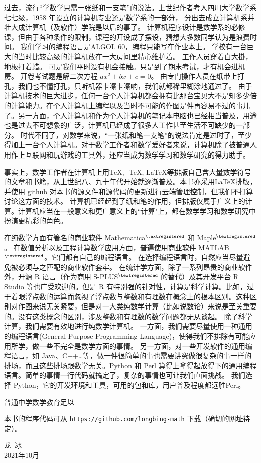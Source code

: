 \documentclass[main.tex]{subfiles}
\begin{document}
过去，流行“学数学只需一张纸和一支笔”的说法。上世纪作者考入四川大学数学系七七级，1958 年设立的计算机专业还是数学系的一部分，
分出去成立计算机系并壮大成计算机（及软件）学院是以后的事了。
计算机程序设计是数学系的必修课，但由于各种条件的限制，课程的开设成了摆设，猜想大多数同学认为是浪费时间。
我们学习的编程语言是ALGOL 60，编程只能写在作业本上。
学校有一台巨大的当时比较高级的计算机放在一大房间里精心维护着。
工作人员穿着白大掛，地板打着蜡。
可是我们平时没有机会接触。只是到了期末考试，才有机会进机房。
开卷考试题是解二次方程 $ax^2+bx+c = 0$。
由专门操作人员在纸带上打孔，我们也不懂打孔，只听机器卡嚓卡嚓响，我们就都稀里糊涂地通过了。
由于计算机技术的巨大进步，任何一台个人计算机都会拥有比那台宝贝大不是知多少倍的计算能力。在个人计算机上编程以及当时不可能的作图是件再容易不过的事儿了。另一方面，个人计算机和作为个人计算机的笔记本电脑也已经相当普及，用途也是过去不可想象的广泛，计算机已经成了很多人工作甚至生活不可缺少的一部分。
时代不同了，对数学来说，“一张纸和笔一支笔”的说法肯定是过时了，至少得加上一台个人计算机。对于数学工作者和数学爱好者来说，计算机除了被普通人用作上互联网和玩游戏的工具外，还应当成为数学学习和数学研究的得力助手。

事实上，数学工作者在计算机上用\TeX, \AmS-\TeX, \LaTeX 等排版自己含大量数学符号的文章和书籍，从上世纪八、九十年代开始就逐渐普及。本书亦采用\LaTeX 排版， 并使用 github 对本书的源文件和源代码的更新进行云端管理控制，但我们不打算讨论这方面的技术。
计算机已经起到了纸和笔的作用，但排版仅属于广义上的计算。计算机应当在一般意义和更广意义上的“计算"上，都在数学学习和数学研究中扮演更精彩的角色。

在纯数学方面有箸名的商业软件 Mathematica${}^{\textregistered}$ 和 Maple${}^{\textregistered}$。
在数值分析以及工程计算数学应用方面，普遍使用商业软件 MATLAB${}^{\textregistered}$。它们都有自己的编程语言。
在选择编程语言时，自然应当尽量避免被必须与之匹配的商业软件套牢。
在统计学方面，除了一系列昂贵的商业软件外，开源 R 语言（作为商用 S-PLUS${}^{\textregistered}$ 的替代）及其开发平台 R Studio 等也广受欢迎的。但是 R 有特别强的针对性，计算是科学计算。比如，过于着眼浮点数的运算而忽视了浮点数与整数和有理数在概念上的根本区别。这种区别对作图来说无关紧要，但是对一大类纯数学计算（比如说数论）来说是至关重要的。没有这类概念的区别，涉及整数和有理数的数学问题都无从谈起。
除了科学计算，我们需要有效地进行纯数学计算机。
一方面，我们需要尽量使用一种通用的编程语言(General-Purpose Programming Language)，使得我们不排除有可能应用所学，做一些不完全是数学方面的事情。
另一方面，对一些开发软件的通用编程语言，如 Java、C++…等，做一件很简单的事也需要讲究做很复杂的事一样的排场，而且这些排场跟数学无关。Python 和 Perl 算得上拿得起放得下的通用编程语言。简单的事情一行代码就搞定了，复杂的事情也可让我们直面挑战。
我们选择 Python，它的开发环境和工具，可用的包和库，用户普及程度都远胜Perl。

普通中学数学教育足以


本书的程序代码可从 \verb|https://github.com/longbing-math| 下载（确切的网址待定）。


\begin{flushright}
	\centering
{\kaishu 龙\,  冰}\\
2021年10月
\end{flushright}
\end{document}
